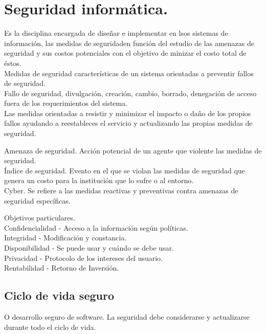 \newpage
\part{Seguridad inform\'{a}tica.}

Es la disciplina encargada de dise\~{n}ar e implementar en lsos sistemas de informaci\'{o}n, las medidas de seguridaden funci\'{o}n del estudio de las amenazas de seguridad y sus costos potenciales con el objetivo de minizar el costo total de \'{e}stos.\\

Medidas de seguridad caracter\'{i}sticas de un sistema orientadas a preventir fallos de seguridad.\\

Fallo de seguridad, divulgaci\'{o}n, creaci\'{o}n, cambio, borrado, denegaci\'{o}n de acceso fuera de los requerimientos del sistema.\\

Las medidas orientadas a resistir y minimizar el impacto o da\~{n}o de los propios fallos ayudando a reestableces el servicio y actualizando las propias medidas de seguridad.

Amenaza de seguridad. Acci\'{o}n potencial de un agente que violente las medidas de seguridad.\\

\'{I}ndice de seguridad. Evento en el que se violan las medidas de seguridad que genera un costo para la instituci\'{o}n que lo sufre o al entorno.\\

Cyber. Se refiere a las medidas reactivas y preventivas contra amenazas de seguridad espec\'{i}ficas.

Objetivos particulares.\\

Confidencialidad - Acceso a la informaci\'{o}n seg\'{u}n pol\'{i}ticas.\\
Integridad - Modificaci\'{o}n y constancia.\\
Disponibilidad - Se puede usar y cu\'{a}ndo se debe usar.\\
Privacidad - Protocolo de los intereses del usuario.\\
Rentabilidad - Retorno de Inversi\'{o}n.\\

\chapter{Ciclo de vida seguro}
O desarrollo seguro de software.
La seguridad debe considerarse y actualizarse durante todo el ciclo de vida.

